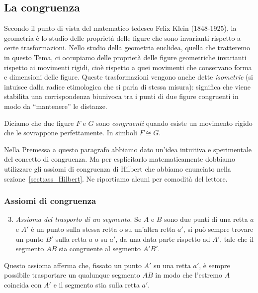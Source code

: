 \subsection{La congruenza}

Secondo il punto di vista del matematico tedesco Felix Klein 
(1848-1925), la geometria è lo studio delle proprietà delle figure 
che sono invarianti rispetto a certe trasformazioni. Nello studio 
della geometria euclidea, quella che tratteremo in questo Tema, ci 
occupiamo delle proprietà delle figure geometriche invarianti 
rispetto ai movimenti rigidi, cioè rispetto a quei movimenti che 
conservano forma e dimensioni delle figure. Queste trasformazioni 
vengono anche dette \emph{isometrie} (si intuisce dalla radice 
etimologica che si parla di stessa misura): significa che viene 
stabilita una corrispondenza biunivoca tra i punti di due figure 
congruenti in modo da ``mantenere'' le distanze.

\begin{definizione}
Diciamo che due figure \(F\) e \(G\) sono \emph{congruenti} quando esiste 
un movimento rigido che le sovrappone perfettamente. In simboli 
\(F\cong G\).
\end{definizione}

Nella Premessa a questo paragrafo abbiamo dato un'idea intuitiva e 
sperimentale del concetto di congruenza. Ma per esplicitarlo 
matematicamente dobbiamo utilizzare gli assiomi di congruenza di 
Hilbert che abbiamo enunciato nella sezione~\ref{sect:ass_Hilbert}. 
Ne riportiamo alcuni per comodità del lettore.


\subsubsection{Assiomi di congruenza}

\begin{enumerate}[label=\Roman{*}.]
\setcounter{enumi}{2}
\item \emph{Assioma del trasporto di un segmento}. Se \(A\) e \(B\) sono 
due punti di una retta \(a\) e \(A'\) è un punto sulla stessa retta o su 
un'altra retta \(a'\), si può sempre trovare un punto \(B'\) sulla retta 
\(a\) o su \(a'\), da una data parte rispetto ad \(A'\), tale che il 
segmento \(AB\) sia congruente al segmento \(A'B'\).
\end{enumerate}
Questo assioma afferma che, fissato un punto \(A'\) su una retta \(a'\), 
è sempre possibile trasportare un qualunque segmento \(AB\) in modo che 
l'estremo \(A\) coincida con \(A'\) e il segmento stia sulla retta \(a'\).

